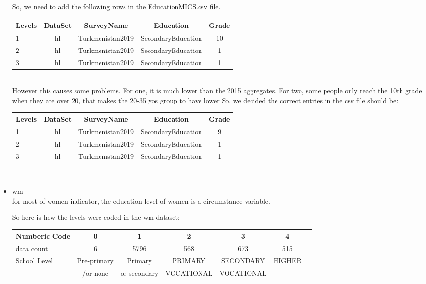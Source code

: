 \documentclass[12pt]{article}
\begin{document}
\begin{itemize}
 So, we need to add the following rows in the EducationMICS.csv file.
 
     \begin{tabular}{|l|c|c|c|c|}
 	\hline
 	Levels & DataSet & SurveyName & Education & Grade\\
 	\hline
 	1 & hl & Turkmenistan2019 & SecondaryEducation & 10 \\
 	2 & hl & Turkmenistan2019 & SecondaryEducation & 1 \\
 	3 & hl & Turkmenistan2019 & SecondaryEducation & 1 \\
 	\hline
 \end{tabular}\\

 However this causes some problems. For one, it is much lower than the 2015 aggregates. For two, some people only reach the 10th grade when they are over 20, that makes the 20-35 yos group to have lower So, we decided the correct entries in the csv file should be: \\
 
      \begin{tabular}{|l|c|c|c|c|}
 	\hline
 	Levels & DataSet & SurveyName & Education & Grade\\
 	\hline
 	1 & hl & Turkmenistan2019 & SecondaryEducation & 9 \\
 	2 & hl & Turkmenistan2019 & SecondaryEducation & 1 \\
 	3 & hl & Turkmenistan2019 & SecondaryEducation & 1 \\
 	\hline
 \end{tabular}\\

\item wm \\
      for most of women indicator, the education level of women is a circumstance variable.
      
      So here is how the levels were coded in the wm dataset:
      
     		{\small
     	\begin{tabular}{l|c|c|c|c|c|c|}
     		\hline 
     		Numberic Code & 0 & 1 & 2 & 3 & 4 \\
     		\hline
     		data count & 6  & 5796 & 568 & 673 & 515 \\
     		\hline
     		School Level & Pre-primary  & Primary   & PRIMARY& SECONDARY & HIGHER \\ 
     		&/or none & or secondary &VOCATIONAL &VOCATIONAL & \\ 			
     		\hline                                       
     	\end{tabular}
     } 


\end{itemize}
\end{document}
